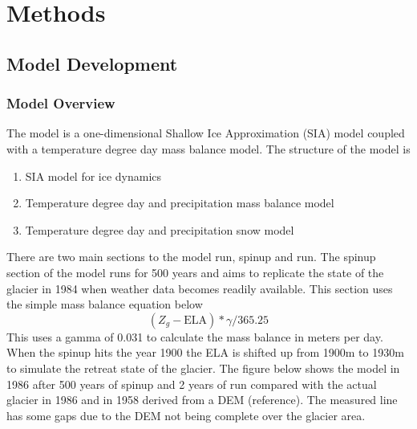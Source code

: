 \documentclass{article}
\begin{document}
\section{Methods}

\subsection{Model Development}
\subsubsection{Model Overview}

The model is a one-dimensional Shallow Ice Approximation (SIA) model coupled with a temperature degree day mass balance model. The structure 
of the model is
\begin{enumerate}
    \item SIA model for ice dynamics
    \item Temperature degree day and precipitation mass balance model
    \item Temperature degree day and precipitation snow model
\end{enumerate}

There are two main sections to the model run, spinup and run. The spinup section of the model runs for 500 years and aims to replicate the 
state of the glacier in 1984 when weather data becomes readily available. This section uses the simple mass balance equation below
\begin{equation}(Z_g-\text{ELA})*\gamma /365.25\end{equation}
This uses a gamma of 0.031 to calculate the mass balance in meters per day. When the spinup hits the year 1900 the ELA is shifted up from 1900m to 1930m to simulate the 
retreat state of the glacier. The figure below shows the model in 1986 after 500 years of spinup and 2 years of run compared with the actual 
glacier in 1986 and in 1958 derived from a DEM (reference). The measured line has some gaps due to the DEM not being complete over the glacier area.
\end{document}
